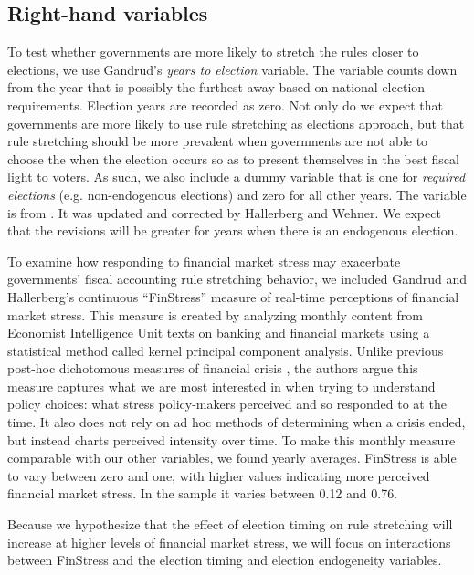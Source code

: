 \documentclass[]{article}
\begin{document}
\subsection{Right-hand variables}

To test whether governments are more likely to stretch the rules closer to elections, we use Gandrud's \citeyearpar{gandrudYrcurnt} \emph{years to election} variable. The variable counts down from the year that is possibly the furthest away based on national election requirements. Election years are recorded as zero. Not only do we expect that governments are more likely to use rule stretching as elections approach, but that rule stretching should be more prevalent when governments are not able to choose the when the election occurs so as to present themselves in the best fiscal light to voters. As such, we also include a dummy variable that is one for \emph{required elections} (e.g. non-endogenous elections) and zero for all other years. The variable is from \cite{Brender2008}. It was updated and corrected by Hallerberg and Wehner. We expect that the revisions will be greater for years when there is an endogenous election.

To examine how responding to financial market stress may exacerbate governments' fiscal accounting rule stretching behavior, we included Gandrud and Hallerberg's \citeyearpar{finstress_paper} continuous ``FinStress'' measure of real-time perceptions of financial market stress. This measure is created by analyzing monthly content from Economist Intelligence Unit texts on banking and financial markets using a statistical method called kernel principal component analysis. Unlike previous post-hoc dichotomous measures of financial crisis \citep[e.g. measures compiled by][]{Laeven2012,ReinhartRog2010}, the authors argue this measure captures what we are most interested in when trying to understand policy choices: what stress policy-makers perceived and so responded to at the time. It also does not rely on ad hoc methods of determining when a crisis ended, but instead charts perceived intensity over time. To make this monthly measure comparable with our other variables, we found yearly averages. FinStress is able to vary between zero and one, with higher values indicating more perceived financial market stress. In the sample it varies between 0.12 and 0.76.

Because we hypothesize that the effect of election timing on rule stretching will increase at higher levels of financial market stress, we will focus on interactions between FinStress and the election timing and election endogeneity variables.
\end{document}
